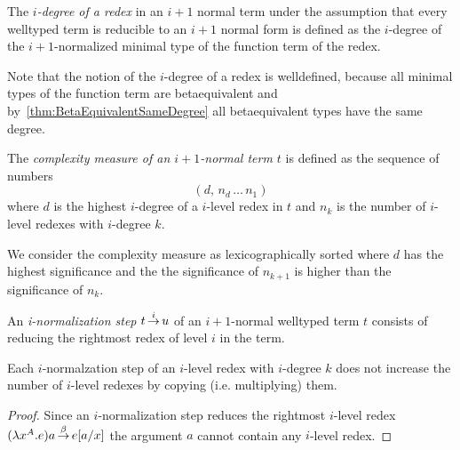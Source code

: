 \begin{definition}
    The \emph{$i$-degree of a redex}
    in an $i+1$ normal term under the assumption
    that every welltyped term is reducible to an $i+1$ normal form is defined as
    the $i$-degree of the $i+1$-normalized minimal type of the function term of
    the redex.

    Note that the notion of the $i$-degree of a redex is welldefined, because
    all minimal types of the function term are betaequivalent and
    by~\ref{thm:BetaEquivalentSameDegree} all betaequivalent types have the same
    degree.
\end{definition}



\begin{definition}
    The \emph{complexity measure of an $i+1$-normal term $t$}
    is defined as the sequence of numbers
    $$
        (d,  \, n_d \, \ldots \, n_1)
    $$
    where $d$ is the highest $i$-degree of a $i$-level redex in $t$ and $n_k$ is the
    number of $i$-level redexes with $i$-degree $k$.

    We consider the complexity measure as lexicographically sorted where $d$ has
    the highest significance and the the significance of $n_{k+1}$ is higher
    than the significance of $n_k$.
\end{definition}


\begin{definition}
    An \emph{i-normalization step} $t {\,\stackrel{i}{\to}\,} u$
    of an $i+1$-normal welltyped
    term $t$ consists of reducing the rightmost redex of level $i$ in the term.
\end{definition}



\begin{theorem}
    Each $i$-normalzation step of an $i$-level redex with $i$-degree $k$ does
    not increase the number of $i$-level redexes by copying (i.e. multiplying)
    them.
    \label{thm:INormalizationNotCopy}

    \begin{proof}
        Since an $i$-normalization step reduces the rightmost $i$-level redex
        $(\lambda x^A.e)a {\,\stackrel{\beta}{\to}\,} e[a/x]$ the argument $a$ cannot contain any
        $i$-level redex.
    \end{proof}
\end{theorem}



